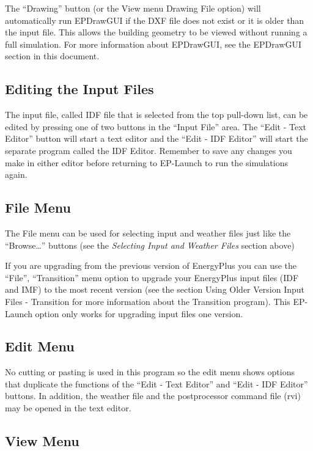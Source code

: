 The ``Drawing'' button (or the View menu Drawing File option) will automatically run EPDrawGUI if the DXF file does not exist or it is older than the input file. This allows the building geometry to be viewed without running a full simulation. For more information about EPDrawGUI, see the EPDrawGUI section in this document.

\subsection{Editing the Input Files}\label{editing-the-input-files}

The input file, called IDF file that is selected from the top pull-down list, can be edited by pressing one of two buttons in the ``Input File'' area. The ``Edit - Text Editor'' button will start a text editor and the ``Edit - IDF Editor'' will start the separate program called the IDF Editor. Remember to save any changes you make in either editor before returning to EP-Launch to run the simulations again.

\subsection{File Menu}\label{file-menu}

The File menu can be used for selecting input and weather files just like the ``Browse\ldots{}'' buttons (see the \emph{Selecting Input and Weather Files} section above)

If you are upgrading from the previous version of EnergyPlus you can use the ``File'', ``Transition'' menu option to upgrade your EnergyPlus input files (IDF and IMF) to the most recent version (see the section Using Older Version Input Files - Transition for more information about the Transition program). This EP-Launch option only works for upgrading input files one version.

\subsection{Edit Menu}\label{edit-menu}

No cutting or pasting is used in this program so the edit menu shows options that duplicate the functions of the ``Edit - Text Editor'' and ``Edit - IDF Editor'' buttons. In addition, the weather file and the postprocessor command file (rvi) may be opened in the text editor.

\subsection{View Menu}\label{view-menu}


